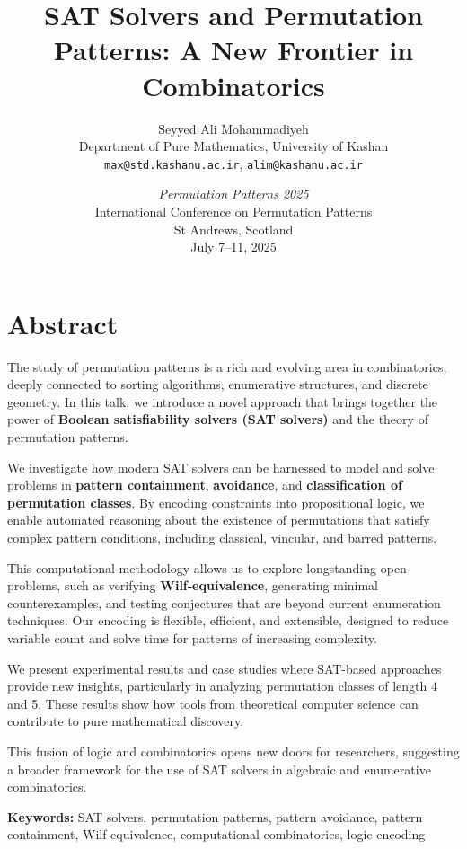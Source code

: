 \documentclass[11pt]{article}
\title{\textbf{SAT Solvers and Permutation Patterns: A New Frontier in Combinatorics}}
\author{Seyyed Ali Mohammadiyeh \\
Department of Pure Mathematics, University of Kashan \\
\texttt{max@std.kashanu.ac.ir}, \texttt{alim@kashanu.ac.ir}
}
\date{
\vspace{0.5em}
\large
\textit{Permutation Patterns 2025} \\
International Conference on Permutation Patterns \\
St Andrews, Scotland \\
July 7--11, 2025
}
\begin{document}
\maketitle

\vspace{-1.5em}
\section*{Abstract}

The study of permutation patterns is a rich and evolving area in combinatorics, deeply connected to sorting algorithms, enumerative structures, and discrete geometry. In this talk, we introduce a novel approach that brings together the power of \textbf{Boolean satisfiability solvers (SAT solvers)} and the theory of permutation patterns. 

\medskip

We investigate how modern SAT solvers can be harnessed to model and solve problems in \textbf{pattern containment}, \textbf{avoidance}, and \textbf{classification of permutation classes}. By encoding constraints into propositional logic, we enable automated reasoning about the existence of permutations that satisfy complex pattern conditions, including classical, vincular, and barred patterns.

\medskip

This computational methodology allows us to explore longstanding open problems, such as verifying \textbf{Wilf-equivalence}, generating minimal counterexamples, and testing conjectures that are beyond current enumeration techniques. Our encoding is flexible, efficient, and extensible, designed to reduce variable count and solve time for patterns of increasing complexity.

\medskip

We present experimental results and case studies where SAT-based approaches provide new insights, particularly in analyzing permutation classes of length 4 and 5. These results show how tools from theoretical computer science can contribute to pure mathematical discovery.

\medskip

This fusion of logic and combinatorics opens new doors for researchers, suggesting a broader framework for the use of SAT solvers in algebraic and enumerative combinatorics.

\vfill
\noindent
\textbf{Keywords:} SAT solvers, permutation patterns, pattern avoidance, pattern containment, Wilf-equivalence, computational combinatorics, logic encoding
\end{document}
